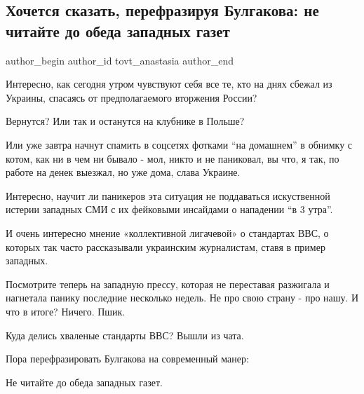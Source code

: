  
 
 
 
 
 
\subsection{Хочется сказать, перефразируя Булгакова: не читайте до обеда западных газет}
\label{sec:16_02_2022.fb.tovt_anastasia.1.ne_chitajte_do_obeda_zapadnyh_gazet}
 
\ifcmt
 author_begin
   author_id tovt_anastasia
 author_end
\fi

Интересно, как сегодня утром чувствуют себя все те, кто на днях сбежал из
Украины, спасаясь от предполагаемого вторжения России? 

Вернутся? Или так и останутся на клубнике в Польше? 

Или уже завтра начнут спамить в соцсетях фотками \enquote{на домашнем} в
обнимку с котом, как ни в чем ни бывало - мол, никто и не паниковал, вы что, я
так, по работе на денек выезжал, но уже дома, слава Украине. 

Интересно, научит ли паникеров эта ситуация не поддаваться искуственной истерии
западных СМИ с их фейковыми инсайдами о нападении \enquote{в 3 утра}. 

И очень интересно мнение «коллективной лигачевой» о стандартах ВВС, о которых
так часто рассказывали украинским журналистам, ставя в пример западных.

Посмотрите теперь на западную прессу, которая не переставая разжигала и
нагнетала панику последние несколько недель. Не про свою страну - про нашу. И
что в итоге? Ничего. Пшик. 

Куда делись хваленые стандарты ВВС? Вышли из чата. 

Пора перефразировать Булгакова на современный манер:

Не читайте до обеда западных газет.
